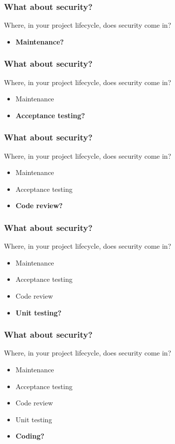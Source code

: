 \documentclass[10pt]{beamer}
\begin{document}
\begin{frame}
	\frametitle{What about security?}

	Where, in your project lifecycle, does security come in?

	\begin{itemize}
		\item \textbf{Maintenance?}
	\end{itemize}
\end{frame}
\begin{frame}
	\frametitle{What about security?}

	Where, in your project lifecycle, does security come in?

	\begin{itemize}
		\item Maintenance
		\item \textbf{Acceptance testing?}
	\end{itemize}
\end{frame}
\begin{frame}
	\frametitle{What about security?}

	Where, in your project lifecycle, does security come in?

	\begin{itemize}
		\item Maintenance
		\item Acceptance testing
		\item \textbf{Code review?}
	\end{itemize}
\end{frame}
\begin{frame}
	\frametitle{What about security?}

	Where, in your project lifecycle, does security come in?

	\begin{itemize}
		\item Maintenance
		\item Acceptance testing
		\item Code review
		\item \textbf{Unit testing?}
	\end{itemize}
\end{frame}
\begin{frame}
	\frametitle{What about security?}

	Where, in your project lifecycle, does security come in?

	\begin{itemize}
		\item Maintenance
		\item Acceptance testing
		\item Code review
		\item Unit testing
		\item \textbf{Coding?}
	\end{itemize}
\end{frame}
\end{document}
